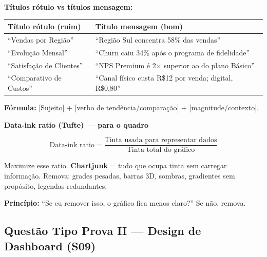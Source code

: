 \begin{SolvedBox}
\textbf{Títulos rótulo vs títulos mensagem:}

\begin{tabular}{|l|l|}
\hline
\textbf{Título rótulo (ruim)} & \textbf{Título mensagem (bom)} \\
\hline
``Vendas por Região'' & ``Região Sul concentra 58\% das vendas'' \\
``Evolução Mensal'' & ``Churn caiu 34\% após o programa de fidelidade'' \\
``Satisfação de Clientes'' & ``NPS Premium é 2$\times$ superior ao do plano Básico'' \\
``Comparativo de Custos'' & ``Canal físico custa R\$12 por venda; digital, R\$0,80'' \\
\hline
\end{tabular}

\textbf{Fórmula:} [Sujeito] + [verbo de tendência/comparação] + [magnitude/contexto].
\end{SolvedBox}

\begin{BoardBox}
\textbf{Data-ink ratio (Tufte) — para o quadro}

\[
\text{Data-ink ratio} = \frac{\text{Tinta usada para representar dados}}{\text{Tinta total do gráfico}}
\]

Maximize esse ratio. \textbf{Chartjunk} = tudo que ocupa tinta sem carregar informação.
Remova: grades pesadas, barras 3D, sombras, gradientes sem propósito, legendas redundantes.

\textbf{Princípio:} ``Se eu remover isso, o gráfico fica menos claro?'' Se não, remova.
\end{BoardBox}

\subsection{Questão Tipo Prova II — Design de Dashboard (S09)}

